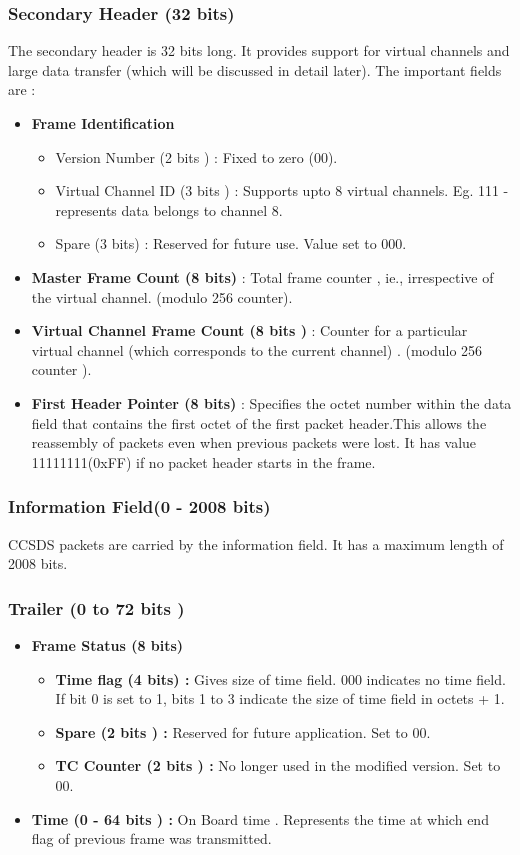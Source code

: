 \documentclass[BTech]{iitmdiss}
\begin{document}
\subsubsection{Secondary Header (32 bits) }
The secondary header is 32 bits long. It provides support for virtual channels and large data transfer (which will be discussed in detail later). The important fields are :
\begin{itemize}
\item \textbf{Frame Identification }
\begin{itemize}
\item Version Number (2 bits ) : Fixed to zero (00).
\item Virtual Channel ID (3 bits ) : Supports upto 8 virtual channels. Eg. 111 - represents data belongs to channel 8.
\item Spare (3 bits) : Reserved for future use. Value set to 000.
\end{itemize}
\item \textbf{Master Frame Count (8 bits)} : Total frame counter , ie., irrespective of the virtual channel. (modulo 256 counter).
\item \textbf{Virtual Channel Frame Count (8 bits ) }: Counter for a particular virtual channel (which corresponds to the current channel) . (modulo 256 counter ).
\item \textbf{First Header Pointer (8 bits) }: Specifies the octet number within the data field that contains the first octet of the first packet header.This allows the reassembly of packets even when previous packets were lost.
It has value 11111111(0xFF) if no packet header starts in the frame.


\end{itemize}
\subsubsection{Information Field(0 - 2008 bits)}
CCSDS packets are carried by the information field. It has a maximum length of 2008 bits.
\subsubsection{Trailer (0 to 72 bits ) }
\begin{itemize}
\item \textbf{Frame Status (8 bits) }
\begin{itemize}
\item \textbf{Time flag (4 bits) : } Gives size of time field. 000 indicates no time field. If bit 0 is set to 1, bits 1 to 3 indicate the size of time field in octets + 1.
\item \textbf{Spare (2 bits ) :} Reserved for future application. Set to 00.
\item \textbf{TC Counter (2 bits ) :} No longer used in the modified version. Set to 00.

\end{itemize}
\item \textbf{Time (0 - 64 bits ) : }On Board time . Represents the time at which end flag of previous frame was transmitted.
\end{itemize}
\end{document}
